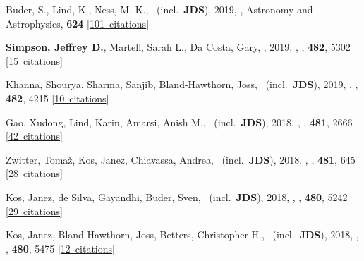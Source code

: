 \item[{\color{numcolor}\scriptsize26}] Buder, S., Lind, K., Ness, M. K., \etal\ (incl.\ \textbf{JDS}), 2019, , Astronomy and Astrophysics, \textbf{624} [\href{https://ui.adsabs.harvard.edu/#abs/2019A&A...624A..19B}{101~citations}]

\item[{\color{numcolor}\scriptsize25}] \textbf{Simpson, Jeffrey D.}, Martell, Sarah L., Da Costa, Gary, \etal, 2019, , \mnras, \textbf{482}, 5302 [\href{https://ui.adsabs.harvard.edu/#abs/2019MNRAS.482.5302S}{15~citations}]

\item[{\color{numcolor}\scriptsize24}] Khanna, Shourya, Sharma, Sanjib, Bland-Hawthorn, Joss, \etal\ (incl.\ \textbf{JDS}), 2019, , \mnras, \textbf{482}, 4215 [\href{https://ui.adsabs.harvard.edu/#abs/2019MNRAS.482.4215K}{10~citations}]

\item[{\color{numcolor}\scriptsize23}] Gao, Xudong, Lind, Karin, Amarsi, Anish M., \etal\ (incl.\ \textbf{JDS}), 2018, , \mnras, \textbf{481}, 2666 [\href{https://ui.adsabs.harvard.edu/#abs/2018MNRAS.481.2666G}{42~citations}]

\item[{\color{numcolor}\scriptsize22}] Zwitter, Toma{\v{z}}, Kos, Janez, Chiavassa, Andrea, \etal\ (incl.\ \textbf{JDS}), 2018, , \mnras, \textbf{481}, 645 [\href{https://ui.adsabs.harvard.edu/#abs/2018MNRAS.481..645Z}{28~citations}]

\item[{\color{numcolor}\scriptsize21}] Kos, Janez, de Silva, Gayandhi, Buder, Sven, \etal\ (incl.\ \textbf{JDS}), 2018, , \mnras, \textbf{480}, 5242 [\href{https://ui.adsabs.harvard.edu/#abs/2018MNRAS.480.5242K}{29~citations}]

\item[{\color{numcolor}\scriptsize20}] Kos, Janez, Bland-Hawthorn, Joss, Betters, Christopher H., \etal\ (incl.\ \textbf{JDS}), 2018, , \mnras, \textbf{480}, 5475 [\href{https://ui.adsabs.harvard.edu/#abs/2018MNRAS.480.5475K}{12~citations}]

